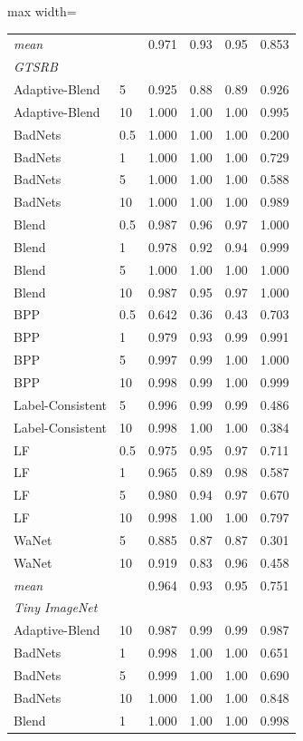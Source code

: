 \begin{table}[htbp]
\begin{adjustbox}{max width=\linewidth}
\begin{tabular}{llrrrr}
\rowcolor{black!8}\emph{mean} &  & 0.971 & 0.93 & 0.95 & 0.853 \\
\multicolumn{6}{l}{\emph{GTSRB}} \\
Adaptive-Blend & 5 & 0.925 & 0.88 & 0.89 & 0.926 \\
Adaptive-Blend & 10 & 1.000 & 1.00 & 1.00 & 0.995 \\
BadNets & 0.5 & 1.000 & 1.00 & 1.00 & 0.200 \\
BadNets & 1 & 1.000 & 1.00 & 1.00 & 0.729 \\
BadNets & 5 & 1.000 & 1.00 & 1.00 & 0.588 \\
BadNets & 10 & 1.000 & 1.00 & 1.00 & 0.989 \\
Blend & 0.5 & 0.987 & 0.96 & 0.97 & 1.000 \\
Blend & 1 & 0.978 & 0.92 & 0.94 & 0.999 \\
Blend & 5 & 1.000 & 1.00 & 1.00 & 1.000 \\
Blend & 10 & 0.987 & 0.95 & 0.97 & 1.000 \\
BPP & 0.5 & 0.642 & 0.36 & 0.43 & 0.703 \\
BPP & 1 & 0.979 & 0.93 & 0.99 & 0.991 \\
BPP & 5 & 0.997 & 0.99 & 1.00 & 1.000 \\
BPP & 10 & 0.998 & 0.99 & 1.00 & 0.999 \\
Label-Consistent & 5 & 0.996 & 0.99 & 0.99 & 0.486 \\
Label-Consistent & 10 & 0.998 & 1.00 & 1.00 & 0.384 \\
LF & 0.5 & 0.975 & 0.95 & 0.97 & 0.711 \\
LF & 1 & 0.965 & 0.89 & 0.98 & 0.587 \\
LF & 5 & 0.980 & 0.94 & 0.97 & 0.670 \\
LF & 10 & 0.998 & 1.00 & 1.00 & 0.797 \\
WaNet & 5 & 0.885 & 0.87 & 0.87 & 0.301 \\
WaNet & 10 & 0.919 & 0.83 & 0.96 & 0.458 \\
\rowcolor{black!8}\emph{mean} &  & 0.964 & 0.93 & 0.95 & 0.751 \\
\multicolumn{6}{l}{\emph{Tiny ImageNet}} \\
Adaptive-Blend & 10 & 0.987 & 0.99 & 0.99 & 0.987 \\
BadNets & 1 & 0.998 & 1.00 & 1.00 & 0.651 \\
BadNets & 5 & 0.999 & 1.00 & 1.00 & 0.690 \\
BadNets & 10 & 1.000 & 1.00 & 1.00 & 0.848 \\
Blend & 1 & 1.000 & 1.00 & 1.00 & 0.998 \\

\end{tabular}
\end{adjustbox}
\end{table}
